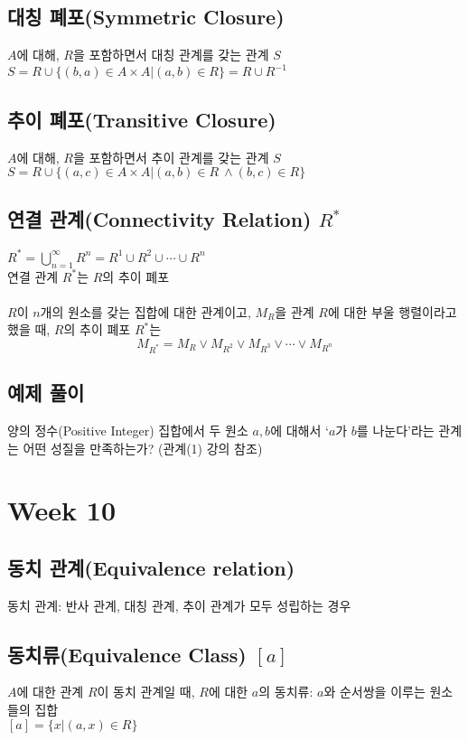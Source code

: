 \subsection{대칭 폐포(Symmetric Closure)}
$A$에 대해, $R$을 포함하면서 대칭 관계를 갖는 관계 $S$\\
$S = R \cup \{(b, a) \in A \times A|(a, b) \in R\} = R \cup R^{-1}$

\subsection{추이 폐포(Transitive Closure)}
$A$에 대해, $R$을 포함하면서 추이 관계를 갖는 관계 $S$\\
$S = R \cup \{(a, c) \in A \times A|(a, b) \in R\ \land (b, c) \in R\}$

\subsection{연결 관계(Connectivity Relation) $R^*$}
$R^* = \bigcup^\infty_{n = 1} R^n = R^1 \cup R^2 \cup \cdots \cup R^n$\\
연결 관계 $R^*$는 $R$의 추이 폐포\\\\
\text{[정리]} $R$이 $n$개의 원소를 갖는 집합에 대한 관계이고, $M_R$을 관계 $R$에 대한 부울 행렬이라고 했을 때, $R$의 추이 폐포 $R^*$는
$$M_{R^*}=M_R\lor M_{R^2}\lor M_{R^3}\lor \cdots \lor M_{R^n}$$

\subsection{예제 풀이}
양의 정수(Positive Integer) 집합에서 두 원소 $a, b$에 대해서 `$a$가 $b$를 나눈다'라는 관계는 어떤 성질을 만족하는가? (관계(1) 강의 참조)

\newpage
\section{Week 10}
\subsection{동치 관계(Equivalence relation)}
동치 관계: 반사 관계, 대칭 관계, 추이 관계가 모두 성립하는 경우

\subsection{동치류(Equivalence Class) $[a]$}
$A$에 대한 관계 $R$이 동치 관계일 때, $R$에 대한 $a$의 동치류: $a$와 순서쌍을 이루는 원소들의 집합\\
$[a] = \{x|(a, x) \in R\}$


